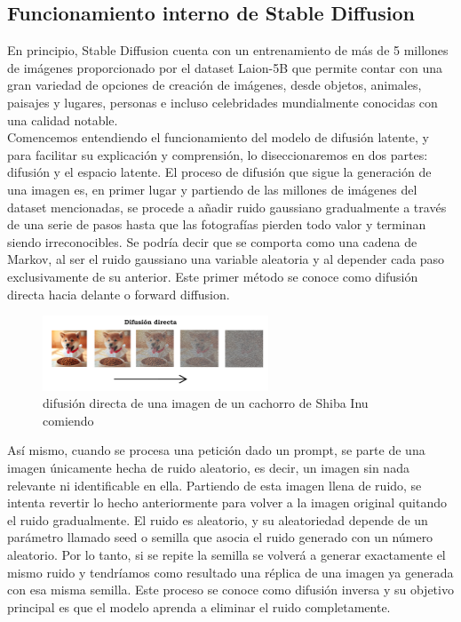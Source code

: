 \subsection{Funcionamiento interno de Stable Diffusion}

En principio, Stable Diffusion cuenta con un entrenamiento de más de 5 millones de imágenes proporcionado por el dataset Laion-5B que permite contar con una gran variedad de opciones de creación de imágenes, desde objetos, animales, paisajes y lugares, personas e incluso celebridades mundialmente conocidas con una calidad notable.\\ 

Comencemos entendiendo el funcionamiento del modelo de difusión latente, y para facilitar su explicación y comprensión,  lo diseccionaremos en dos partes: difusión y el espacio latente. El proceso de difusión que sigue la generación de una imagen es, en primer lugar y partiendo de las millones de imágenes del dataset mencionadas, se procede a añadir ruido gaussiano gradualmente a través de una serie de pasos hasta que las fotografías pierden todo valor y terminan siendo irreconocibles. Se podría decir que se comporta como una cadena de Markov, al ser el ruido gaussiano una variable aleatoria y al depender cada paso exclusivamente de su anterior. Este primer método se conoce como difusión directa hacia delante o forward diffusion.\\

\begin{figure}[h]
	\centering
	\includegraphics[width = 0.6\textwidth]{Imagenes/Vectorial/difusiondirecta.png}
	\caption{difusión directa de una imagen de un cachorro de Shiba Inu comiendo}
	\label{fig:difusiondirecta}
\end{figure}

Así mismo, cuando se procesa una petición dado un prompt, se parte de una imagen únicamente hecha de ruido aleatorio, es decir, un imagen sin nada relevante ni identificable en ella. Partiendo de esta imagen llena de ruido, se intenta revertir lo hecho anteriormente para volver a la imagen original quitando el ruido gradualmente. El ruido es aleatorio, y su aleatoriedad depende de un parámetro llamado seed o semilla que asocia el ruido generado con un número aleatorio. Por lo tanto, si se repite la semilla se volverá a generar exactamente el mismo ruido y tendríamos como resultado una réplica de una imagen ya generada con esa misma semilla. Este proceso se conoce como difusión inversa y su objetivo principal es que el modelo aprenda a eliminar el ruido completamente. \\

